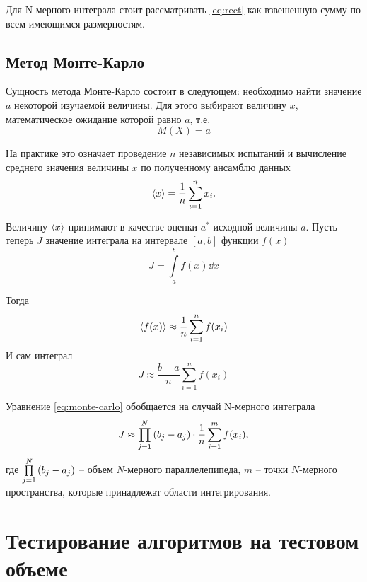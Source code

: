 Для N-мерного интеграла стоит рассматривать \eqref{eq:rect} как взвешенную
сумму по всем имеющимся размерностям.

\subsection{Метод Монте-Карло}%
\label{sub:metod_monte_karlo}

Сущность метода Монте-Карло состоит в следующем: необходимо найти значение $a$
некоторой изучаемой величины. Для этого выбирают величину  $x$, математическое
ожидание которой равно  $a$, т.е.
 \begin{equation}
    \label{eq:}
    M(X) = a
\end{equation}

На практике это означает проведение $n$ независимых испытаний и вычисление
среднего значения величины $x$ по полученному ансамблю данных
\begin{equation}
    \label{eq:}
    \langle x\rangle = \frac{1}{n} \sum\limits_{i=1}^{n} x_i.
\end{equation}

Величину $\langle x\rangle$ принимают в качестве оценки  $a^*$ исходной величины  $a$.
Пусть теперь $J$ значение интеграла на интервале  $[a,b]$ функции $f(x)$
 \begin{equation}
    \label{eq:}
    J = \int\limits_{a}^{b}  f(x) \dd x
\end{equation}

Тогда
\begin{equation}
    \label{eq:}
    \langle f(x)\rangle \approx \frac{1}{n} \sum\limits_{i=1}^{n} f(x_i)
\end{equation}
И сам интеграл
\begin{equation}
    \label{eq:monte-carlo}
    J \approx \frac{b-a}{n} \sum\limits_{i=1}^{n} f(x_i)
\end{equation}

Уравнение \eqref{eq:monte-carlo} обобщается на случай N-мерного
интеграла
\begin{equation}
    \label{eq:}
    J \approx \prod\limits_{j=1}^N \qty(b_j - a_j) \cdot
    \frac{1}{n}\sum\limits_{i=1}^{m} f(x_i), 
\end{equation}
где $\prod\limits_{j=1}^N \qty(b_j - a_j)$  -- объем $N$-мерного
параллелепипеда,  $m$ -- точки  $N$-мерного пространства, которые
принадлежат области интегрирования.



\section{Тестирование алгоритмов на тестовом объеме}

